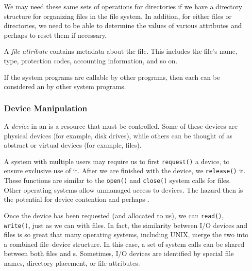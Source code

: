 We may need these same sets of operations for directories if we have a directory structure for organizing files in the file system.
In addition, for either files or directories, we need to be able to determine the values of various attributes and perhaps to reset them if necessary.

\begin{definition}\label{def:File_Attribute}
  A \emph{file attribute} contains metadata about the file.
  This includes the file's name, type, protection codes, accounting information, and so on.
\end{definition}

\begin{remark*}
  If the system programs are callable by other programs, then each can be considered an  by other system programs.
\end{remark*}

\subsubsection{Device Manipulation}\label{subsubsec:Device_Manipulation}
\begin{definition}[Device]\label{def:Device}
  A \emph{device} in an  is a resource that must be controlled.
  Some of these devices are physical devices (for example, disk drives), while others can be thought of as abstract or virtual devices (for example, files).
\end{definition}

A system with multiple users may require us to first \texttt{request()} a device, to ensure exclusive use of it.
After we are finished with the device, we \texttt{release()} it.
These functions are similar to the \texttt{open()} and \texttt{close()} system calls for files.
Other operating systems allow unmanaged access to devices.
The hazard then is the potential for device contention and perhaps .

Once the device has been requested (and allocated to us), we can \texttt{read()}, \texttt{write()}, just as we can with files.
In fact, the similarity between I/O devices and files is so great that many operating systems, including UNIX, merge the two into a combined file–device structure.
In this case, a set of system calls can be shared between both files and s.
Sometimes, I/O devices are identified by special file names, directory placement, or file attributes.

